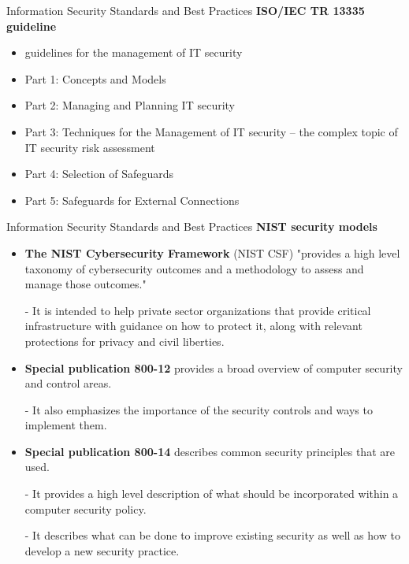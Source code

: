 \documentclass[pdf]{beamer}
\begin{document}
\begin{frame}{Information Security Standards and Best Practices}
\textbf{ISO/IEC TR 13335 guideline}
\begin{itemize}
\item
guidelines for the management of IT security

\item
Part 1:
Concepts and Models

\item
Part 2:
Managing and Planning IT security

\item
Part 3:
Techniques for the Management of IT security – the complex topic of IT security risk assessment

\item
Part 4:
Selection of Safeguards

\item 
Part 5:
Safeguards for External Connections

\end{itemize}
\end{frame}



\begin{frame}{Information Security Standards and Best Practices}
\textbf{NIST security models}
\begin{itemize}
\item
\textbf{The NIST Cybersecurity Framework} (NIST CSF) "provides a high level taxonomy of cybersecurity outcomes and a methodology to assess and manage those outcomes." 

- It is intended to help private sector organizations that provide critical infrastructure with guidance on how to protect it, along with relevant protections for privacy and civil liberties.

\item
\textbf{Special publication 800-12} provides a broad overview of computer security and control areas. 

- It also emphasizes the importance of the security controls and ways to implement them. 

\item
\textbf{Special publication 800-14} describes common security principles that are used. 

- It provides a high level description of what should be incorporated within a computer security policy. 

- It describes what can be done to improve existing security as well as how to develop a new security practice. 

\end{itemize}
\end{frame}
\end{document}
